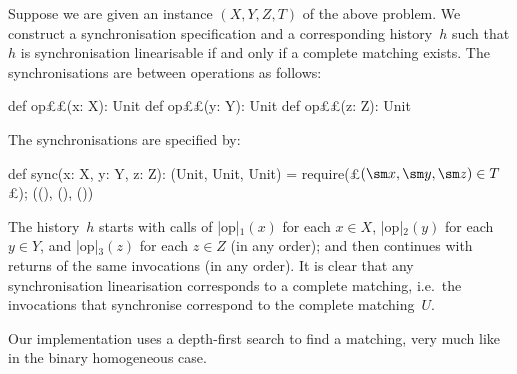 Suppose we are given an instance $(X, Y, Z, T)$ of the above problem.  We
construct a synchronisation specification and a corresponding history~$h$ such
that $h$ is synchronisation linearisable if and only if a complete matching
exists.  The synchronisations are between operations as follows:
\begin{scala}
  def op££(x: X): Unit
  def op££(y: Y): Unit
  def op££(z: Z): Unit
\end{scala}
%
The synchronisations are specified by:
%
\begin{scala}
  def sync(x: X, y: Y, z: Z): (Unit, Unit, Unit) = {
    require(£$(\sm x, \sm y, \sm z) \in T$£); ((), (), ())
  }
\end{scala}
%
The history~$h$ starts with calls of |op|$_1(x)$ for each $x \in X$,
|op|$_2(y)$ for each $y \in Y$, and |op|$_3(z)$ for each $z \in Z$ (in any
order); and then continues with returns of the same invocations (in any
order).  It is clear that any synchronisation linearisation corresponds to a
complete matching, i.e.~the invocations that synchronise correspond to the
complete matching~$U$.

Our implementation uses a depth-first search to find a matching, very much
like in the binary homogeneous case. 
